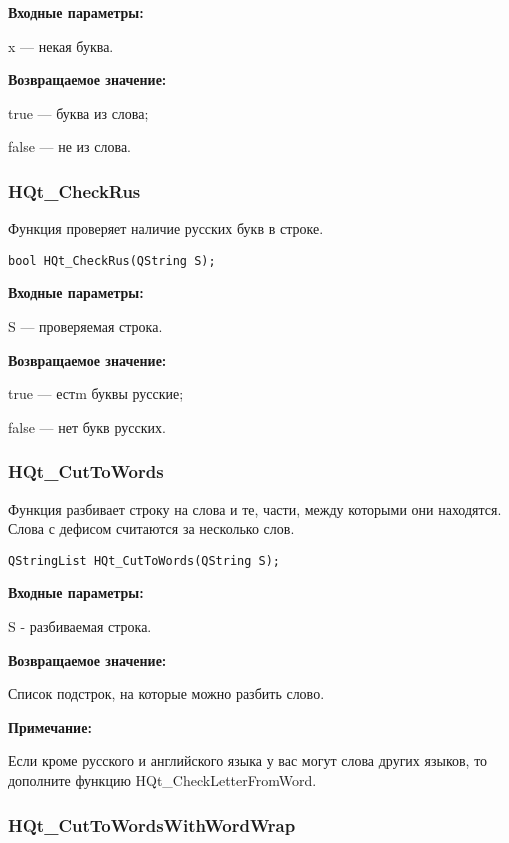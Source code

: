 \documentclass[a4paper,12pt]{article}
\begin{document}
\textbf{Входные параметры:}

x --- некая буква.

\textbf{Возвращаемое значение:}
 
true --- буква из слова;

false --- не из слова.


\subsubsection{HQt\_CheckRus}\label{HQt_CheckRus}

Функция проверяет наличие русских букв в строке.


\begin{lstlisting}[label=code_syntax_HQt_CheckRus,caption=Синтаксис]
bool HQt_CheckRus(QString S);
\end{lstlisting}

\textbf{Входные параметры:}

S --- проверяемая строка.

\textbf{Возвращаемое значение:}
 
true --- естm буквы русские;
 
    false --- нет букв русских.


\subsubsection{HQt\_CutToWords}\label{HQt_CutToWords}

Функция разбивает строку на слова и те, части, между которыми они находятся. Слова с дефисом считаются за несколько слов.


\begin{lstlisting}[label=code_syntax_HQt_CutToWords,caption=Синтаксис]
QStringList HQt_CutToWords(QString S);
\end{lstlisting}

\textbf{Входные параметры:}

S - разбиваемая строка.

\textbf{Возвращаемое значение:}
 
Список подстрок, на которые можно разбить слово.

\textbf{Примечание:}

     Если кроме русского и английского языка у вас могут слова других языков, то дополните функцию HQt\_CheckLetterFromWord.


\subsubsection{HQt\_CutToWordsWithWordWrap}\label{HQt_CutToWordsWithWordWrap}
\end{document}
